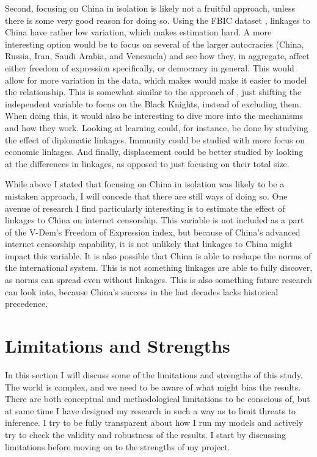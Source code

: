 Second, focusing on China in isolation is likely not a fruitful approach, unless there is some very good reason for doing so. Using the FBIC dataset \citep{moyer_china-us_2021}, linkages to China have rather low variation, which makes estimation hard. A more interesting option would be to focus on several of the larger autocracies (China, Russia, Iran, Saudi Arabia, and Venezuela) and see how they, in aggregate, affect either freedom of expression specifically, or democracy in general. This would allow for more variation in the data, which makes would make it easier to model the relationship. This is somewhat similar to the approach of \citet{tansey_ties_2017}, just shifting the independent variable to focus on the Black Knights, instead of excluding them. When doing this, it would also be interesting to dive more into the mechanisms and how they work. Looking at learning could, for instance, be done by studying the effect of diplomatic linkages. Immunity could be studied with more focus on economic linkages. And finally, displacement could be better studied by looking at the differences in linkages, as opposed to just focusing on their total size.

While above I stated that focusing on China in isolation was likely to be a mistaken approach, I will concede that there are still ways of doing so. One avenue of research I find particularly interesting is to estimate the effect of linkages to China on internet censorship. This variable is not included as a part of the V-Dem's Freedom of Expression index, but because of China's advanced internet censorship capability, it is not unlikely that linkages to China might impact this variable. It is also possible that China is able to reshape the norms of the international system. This is not something linkages are able to fully discover, as norms can spread even without linkages. This is also something future research can look into, because China's success in the last decades lacks historical precedence.

\section{Limitations and Strengths}
In this section I will discuss some of the limitations and strengths of this study. The world is complex, and we need to be aware of what might bias the results. There are both conceptual and methodological limitations to be conscious of, but at same time I have designed my research in such a way as to limit threats to inference. I try to be fully transparent about how I run my models and actively try to check the validity and robustness of the results. I start by discussing limitations before moving on to the strengths of my project.

